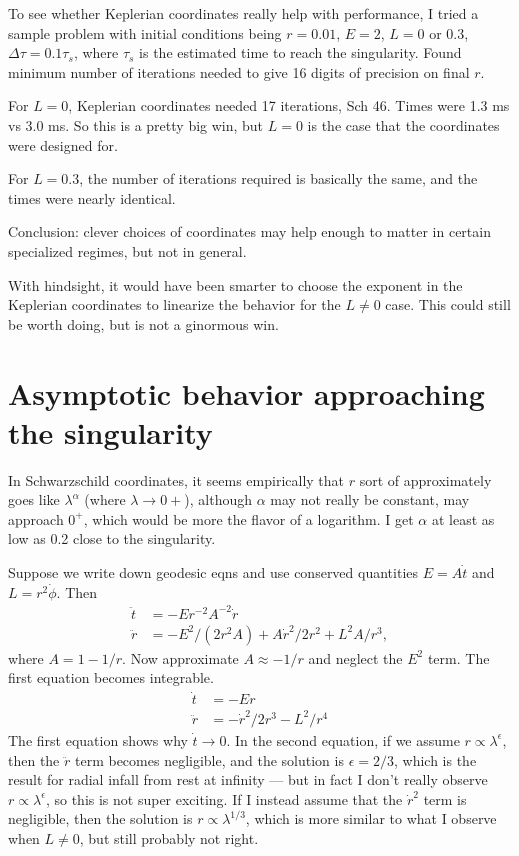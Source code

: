 \documentclass{article}
\begin{document}
To see whether Keplerian coordinates really help with performance, I tried a sample
problem with initial conditions being $r=0.01$, $E=2$, $L=0$ or $0.3$, $\Delta\tau=0.1\tau_s$,
where $\tau_s$ is the estimated time to reach the singularity. Found minimum
number of iterations needed to give 16 digits of precision on final $r$.

For $L=0$, Keplerian coordinates needed 17 iterations, Sch 46. Times were 1.3 ms vs 3.0 ms.
So this is a pretty big win, but $L=0$ is the case that the coordinates were designed for.

For $L=0.3$, the number of iterations required is basically the same, and the times were
nearly identical.

Conclusion: clever choices of coordinates may help enough to matter
in certain specialized regimes, but not in general.

With hindsight, it would have been smarter to choose the exponent in the Keplerian coordinates
to linearize the behavior for the $L\ne0$ case. This could still be worth doing, but is not
a ginormous win.

\section{Asymptotic behavior approaching the singularity}

In Schwarzschild coordinates, 
it seems empirically that $r$ sort of approximately goes like $\lambda^\alpha$
(where $\lambda\rightarrow0+$),
although $\alpha$ may not really be constant, may approach $0^+$, which would be more the flavor
of a logarithm. I get $\alpha$ at least as low as 0.2 close to the singularity.

Suppose we write down geodesic eqns and use conserved quantities $E=A\dot{t}$ and $L=r^2\dot{\phi}$.
Then
\begin{align*}
  \ddot{t} &= -Er^{-2}A^{-2}\dot{r} \\
  \ddot{r} &= -E^2/(2r^2A)+A\dot{r}^2/2r^2+L^2A/r^3,
\end{align*}
where $A=1-1/r$. Now approximate $A\approx -1/r$ and neglect the $E^2$ term. The first equation
becomes integrable.
\begin{align*}
  \dot{t} &= -Er \\
  \ddot{r} &= -\dot{r}^2/2r^3-L^2/r^4
\end{align*}
The first equation shows why $\dot{t}\rightarrow0$. In the second equation, if we assume
$r\propto \lambda^\epsilon$, then the $\ddot{r}$ term becomes negligible, and the solution
is $\epsilon=2/3$, which is the result for radial infall from rest at infinity --- but in
fact I don't really observe $r\propto \lambda^\epsilon$, so this is not super exciting.
If I instead assume that the $\dot{r}^2$ term is negligible, then the solution is
$r\propto\lambda^{1/3}$, which is more similar to what I observe when $L\ne0$, but still probably not
right.
\end{document}
